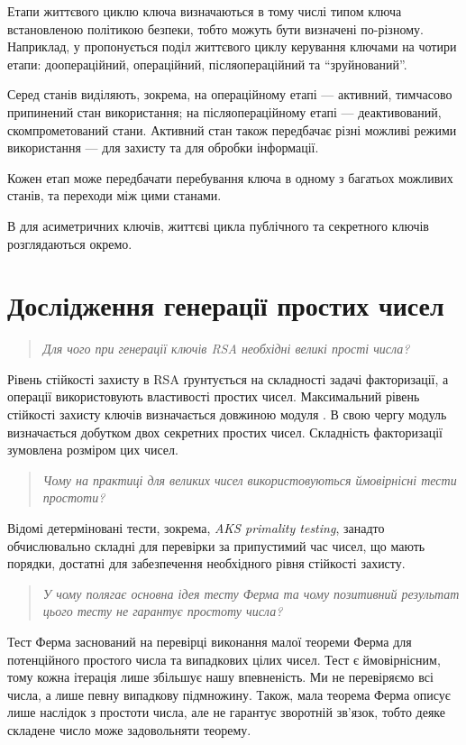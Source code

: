 \documentclass{kpi-lab}
\begin{document}
Етапи життєвого циклю ключа визначаються в тому числі
типом ключа встановленою політикою безпеки,
тобто можуть бути визначені по-різному.
Наприклад, у \cite{Barker2020a} пропонується поділ
життєвого циклу керування ключами на чотири етапи:
доопераційний, операційний, післяопераційний та \enquote{зруйнований}.

Серед станів виділяють, зокрема, на операційному етапі ---
активний, тимчасово припинений стан використання;
на післяопераційному етапі --- деактивований, скомпрометований стани.
Активний стан також передбачає різні можливі режими використання ---
для захисту та для обробки інформації.

Кожен етап може передбачати перебування ключа в одному з
багатьох можливих станів, та переходи між цими станами.

В для асиметричних ключів, життєві цикла публічного та
секретного ключів розглядаються окремо.

\chapter{Дослідження генерації простих чисел}

\begin{quote}\small\it
  Для чого при генерації ключів RSA необхідні великі прості числа?
\end{quote}

Рівень стійкості захисту в RSA ґрунтується на складності
задачі факторизації, а операції використовують властивості
простих чисел. Максимальний рівень стійкості захисту
ключів визначається довжиною модуля \cite{Barker2019}.
В свою чергу модуль визначається добутком двох секретних
простих чисел. Складність факторизації зумовлена розміром цих чисел.

\begin{quote}\small\it
  Чому на практиці для великих чисел використовуються
  ймовірнісні тести простоти?
\end{quote}

Відомі детерміновані тести, зокрема, \emph{AKS primality
testing}, занадто обчислювально складні
для перевірки за припустимий час чисел, що мають порядки,
достатні для забезпечення необхідного
рівня стійкості захисту.

\begin{quote}\small\it
  У чому полягає основна ідея тесту Ферма та чому
  позитивний результат цього тесту не гарантує простоту числа?
\end{quote}

Тест Ферма заснований на перевірці виконання малої теореми Ферма для
потенційного простого числа та випадкових цілих чисел.
Тест є ймовірнісним, тому кожна ітерація лише збільшує нашу
впевненість.
Ми не перевіряємо всі числа, а лише певну випадкову підмножину.
Також, мала теорема Ферма описує лише наслідок з простоти числа,
але не гарантує зворотній зв'язок, тобто деяке складене
число може задовольняти теорему.
\end{document}

